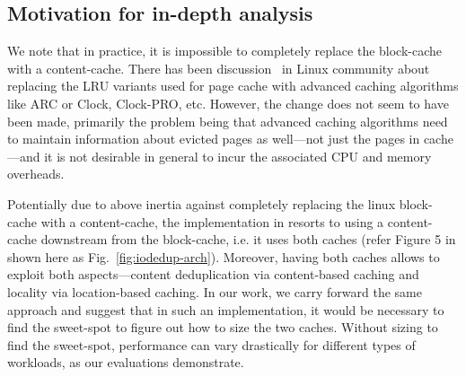 \subsection{Motivation for in-depth analysis}
We note that in practice, it is impossible to completely replace the
block-cache with a content-cache. 
There has been discussion~\cite{advanced-page-replacement-algo} in Linux 
community about replacing the LRU variants used for page cache with 
advanced caching algorithms like ARC or Clock, Clock-PRO, etc. 
However, the change does not seem to have been made, primarily the problem 
being that advanced caching algorithms need to maintain information about 
evicted pages as well---not just the pages in cache---and it is not 
desirable in general to incur the associated CPU and memory overheads. 

Potentially due to above inertia against completely replacing the 
linux block-cache with a content-cache, the implementation in \cite{iodedup} 
resorts to using a content-cache downstream from the block-cache, i.e. it 
uses both caches (refer Figure 5 in \cite{iodedup}
shown here as Fig.~\ref{fig:iodedup-arch}). 
Moreover, having both caches allows to exploit both 
aspects---content deduplication via content-based caching and locality 
via location-based caching. In our work, we carry forward the same 
approach and suggest that in such an implementation, it would be 
necessary to find the sweet-spot to figure out how to size the two 
caches. Without sizing to find the sweet-spot, performance can 
vary drastically for different types of workloads, as our evaluations
demonstrate.

